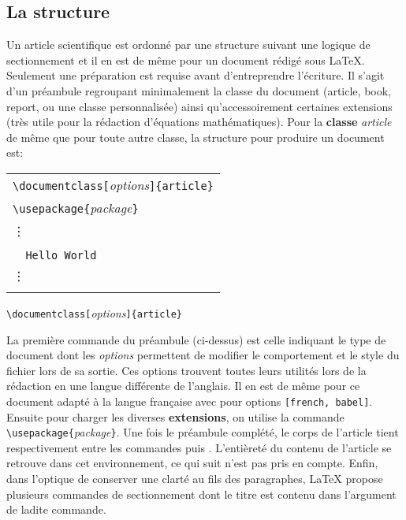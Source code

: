 \subsection*{La structure}
Un article scientifique est ordonné par une structure suivant une logique de sectionnement et il en est de même pour un document rédigé sous \LaTeX. Seulement une préparation est requise avant d'entreprendre l'écriture. Il s'agit d'un préambule regroupant minimalement la classe du document (article, book, report, ou une classe personnalisée) ainsi qu'accessoirement certaines extensions (très utile pour la rédaction d'équations mathématiques). Pour la \textbf{classe} \emph{article} de même que pour toute autre classe, la structure pour produire un document est:
%	
\begin{table}[H]
	\centering
	\begin{tabular}{l}
		\hline
		\verb|\documentclass[|\textit{options}\verb|]|\verb|{article}|\\
		\verb|\usepackage{|\textit{package}\verb|}|\\
		\vdots\\
		\verb||\\
		\verb|	Hello World|\\
		\vdots\\
		\verb||\\
		\hline
	\end{tabular}
\end{table}
%
\break 
\begin{center}
	\verb|\documentclass[|\textit{options}\verb|]|\verb|{article}|
\end{center}
%
\par La première commande du préambule (ci-dessus) est celle indiquant le type de document dont les \textit{options} permettent de modifier le comportement et le style du fichier lors de sa sortie. Ces options trouvent toutes leurs utilités lors de la rédaction en une langue différente de l'anglais. Il en est de même pour ce document adapté à la langue française avec pour options \verb|[french, babel]|. Ensuite pour charger les diverses \textbf{extensions}, on utilise la commande \verb|\usepackage{|\textit{package}\verb|}|. Une fois le préambule complété,  le corps de l'article tient respectivement entre les commandes \verb|| puis \verb||. L'entièreté du contenu de l'article se retrouve dans cet environnement, ce qui suit n'est pas pris en compte. Enfin, dans l'optique de conserver une clarté au fils des paragraphes, \LaTeX{} propose plusieurs commandes de sectionnement dont le titre est contenu dans l'argument de ladite commande.
